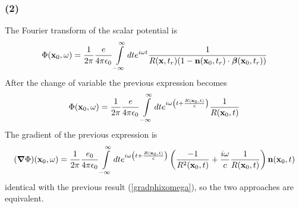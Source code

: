 \subsubsection{(2)}

The Fourier transform of the scalar potential is
\begin{align}
    \Phi({\bf x}_0,\omega)=\frac1{2\pi}\frac{e}{4\pi\epsilon_0}\int\limits_{-\infty}^{\infty}dte^{i\omega t}\frac{1}{R({\bf x},t_r)(1-{\bf n}({\bf x}_0,t_r)\cdot{\boldsymbol{\beta}}({\bf x}_0,t_r))}
\end{align}
After the change of variable the previous expression becomes
\begin{align}
    \Phi({\bf x}_0,\omega)=\frac1{2\pi}\frac{e}{4\pi\epsilon_0}\int\limits_{-\infty}^{\infty}dte^{i\omega \left(t+\frac{R({\bf x}_0,t)}c\right)}\frac{1}{R({\bf x}_0,t)}
\end{align}
The gradient of the previous expression is
\begin{align}
    ({\boldsymbol{\nabla}}\Phi)({\bf x}_0,\omega)=\frac1{2\pi}\frac{e_0}{4\pi\epsilon_0}\int\limits_{-\infty}^{\infty}dte^{i\omega \left(t+\frac{R({\bf x}_0,t)}c\right)}\left(\frac{-1}{R^2({\bf x}_0,t)}+\frac{i\omega}{c}\frac1{R({\bf x}_0,t)}\right){\bf n}({\bf x}_0,t)
\end{align}
identical with the previous  result (\ref{gradphixomega}), so the two approaches are equivalent.

